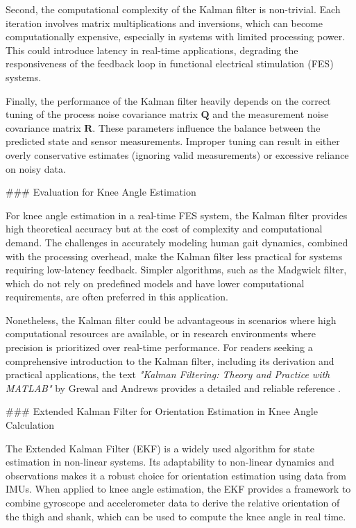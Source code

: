 Second, the computational complexity of the Kalman filter is non-trivial. Each iteration involves matrix multiplications and inversions, which can become computationally expensive, especially in systems with limited processing power. This could introduce latency in real-time applications, degrading the responsiveness of the feedback loop in functional electrical stimulation (FES) systems.

Finally, the performance of the Kalman filter heavily depends on the correct tuning of the process noise covariance matrix \( \mathbf{Q} \) and the measurement noise covariance matrix \( \mathbf{R} \). These parameters influence the balance between the predicted state and sensor measurements. Improper tuning can result in either overly conservative estimates (ignoring valid measurements) or excessive reliance on noisy data.

### Evaluation for Knee Angle Estimation

For knee angle estimation in a real-time FES system, the Kalman filter provides high theoretical accuracy but at the cost of complexity and computational demand. The challenges in accurately modeling human gait dynamics, combined with the processing overhead, make the Kalman filter less practical for systems requiring low-latency feedback. Simpler algorithms, such as the Madgwick filter, which do not rely on predefined models and have lower computational requirements, are often preferred in this application.

Nonetheless, the Kalman filter could be advantageous in scenarios where high computational resources are available, or in research environments where precision is prioritized over real-time performance. For readers seeking a comprehensive introduction to the Kalman filter, including its derivation and practical applications, the text \textit{"Kalman Filtering: Theory and Practice with MATLAB"} by Grewal and Andrews provides a detailed and reliable reference \cite{grewal_kalman_2015}.















### Extended Kalman Filter for Orientation Estimation in Knee Angle Calculation

The Extended Kalman Filter (EKF) is a widely used algorithm for state estimation in non-linear systems. Its adaptability to non-linear dynamics and observations makes it a robust choice for orientation estimation using data from IMUs. When applied to knee angle estimation, the EKF provides a framework to combine gyroscope and accelerometer data to derive the relative orientation of the thigh and shank, which can be used to compute the knee angle in real time.

